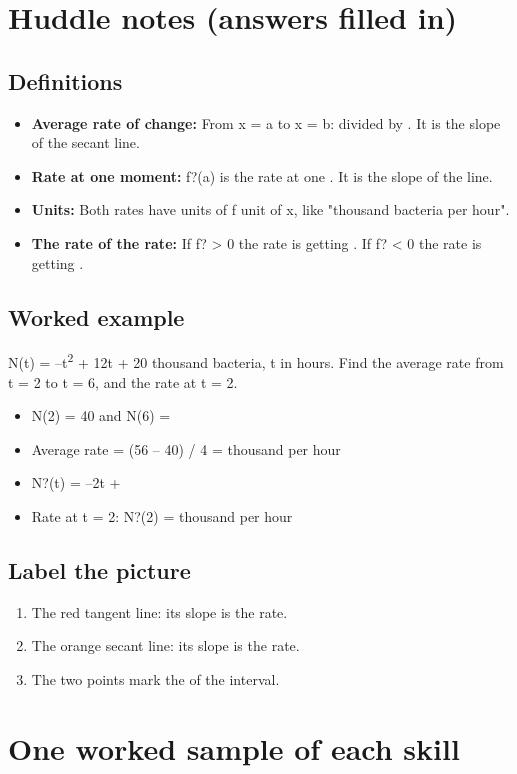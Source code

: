 \documentclass[11pt]{article}
\begin{document}
\section*{Huddle notes (answers filled in)}
\subsection*{Definitions}\begin{itemize}
\item \textbf{Average rate of change:} From x = a to x = b:  divided by . It is the slope of the secant line.
\item \textbf{Rate at one moment:} f?(a) is the rate at one . It is the slope of the  line.
\item \textbf{Units:} Both rates have units of f  unit of x, like "thousand bacteria per hour".
\item \textbf{The rate of the rate:} If f? > 0 the rate is getting . If f? < 0 the rate is getting .
\end{itemize}
\subsection*{Worked example}
N(t) = --t\textsuperscript{2} + 12t + 20 thousand bacteria, t in hours. Find the average rate from t = 2 to t = 6, and the rate at t = 2.\\
\begin{itemize}
\item N(2) = 40 and N(6) = 
\item Average rate = (56 -- 40) / 4 =  thousand per hour
\item N?(t) = --2t + 
\item Rate at t = 2: N?(2) =  thousand per hour
\end{itemize}
\subsection*{Label the picture}
\begin{enumerate}
\item The red tangent line: its slope is the  rate.
\item The orange secant line: its slope is the  rate.
\item The two points mark the  of the interval.
\end{enumerate}
\section*{One worked sample of each skill}
\end{document}
